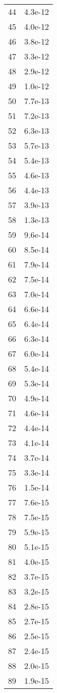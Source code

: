 \begin{tabular}{lr}
44  & 4.3e-12 \\
45  & 4.0e-12 \\
46  & 3.8e-12 \\
47  & 3.3e-12 \\
48  & 2.9e-12 \\
49  & 1.0e-12 \\
50  & 7.7e-13 \\
51  & 7.2e-13 \\
52  & 6.3e-13 \\
53  & 5.7e-13 \\
54  & 5.4e-13 \\
55  & 4.6e-13 \\
56  & 4.4e-13 \\
57  & 3.9e-13 \\
58  & 1.3e-13 \\
59  & 9.6e-14 \\
60  & 8.5e-14 \\
61  & 7.9e-14 \\
62  & 7.5e-14 \\
63  & 7.0e-14 \\
64  & 6.6e-14 \\
65  & 6.4e-14 \\
66  & 6.3e-14 \\
67  & 6.0e-14 \\
68  & 5.4e-14 \\
69  & 5.3e-14 \\
70  & 4.9e-14 \\
71  & 4.6e-14 \\
72  & 4.4e-14 \\
73  & 4.1e-14 \\
74  & 3.7e-14 \\
75  & 3.3e-14 \\
76  & 1.5e-14 \\
77  & 7.6e-15 \\
78  & 7.5e-15 \\
79  & 5.9e-15 \\
80  & 5.1e-15 \\
81  & 4.0e-15 \\
82  & 3.7e-15 \\
83  & 3.2e-15 \\
84  & 2.8e-15 \\
85  & 2.7e-15 \\
86  & 2.5e-15 \\
87  & 2.4e-15 \\
88  & 2.0e-15 \\
89  & 1.9e-15 \\

\end{tabular}

